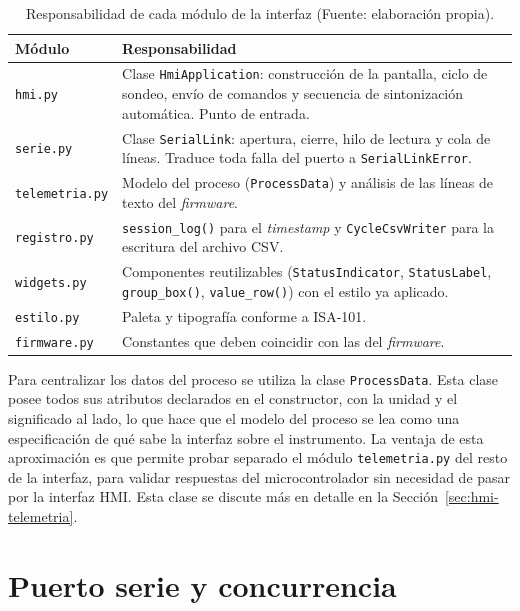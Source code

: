 \begin{table}[htbp]
\centering
  \begin{tabular}{@{}p{}p{}@{}}
  \toprule
  \textbf{Módulo} & \textbf{Responsabilidad} \\
  \midrule
  \texttt{hmi.py} & Clase \texttt{HmiApplication}: construcción de la pantalla, ciclo de sondeo, envío de comandos y secuencia de sintonización automática. Punto de entrada. \\
  \texttt{serie.py} & Clase \texttt{SerialLink}: apertura, cierre, hilo de lectura y cola de líneas. Traduce toda falla del puerto a \texttt{SerialLinkError}. \\
  \texttt{telemetria.py} & Modelo del proceso (\texttt{ProcessData}) y análisis de las líneas de texto del \emph{firmware}. \\
  \texttt{registro.py} & \texttt{session\_log()} para el \textit{timestamp} y \texttt{CycleCsvWriter} para la escritura del archivo CSV. \\
  \texttt{widgets.py} & Componentes reutilizables (\texttt{StatusIndicator}, \texttt{StatusLabel}, \texttt{group\_box()}, \texttt{value\_row()}) con el estilo ya aplicado. \\
  \texttt{estilo.py} & Paleta y tipografía conforme a ISA-101. \\
  \texttt{firmware.py} & Constantes que deben coincidir con las del \emph{firmware}. \\
  \bottomrule
  \end{tabular}
  \caption{Responsabilidad de cada módulo de la interfaz (Fuente: elaboración propia).}
  \label{tab:hmi-modulos}
\end{table}

Para centralizar los datos del proceso se utiliza la clase \texttt{ProcessData}. Esta clase posee todos sus atributos declarados en el constructor, con la unidad y el significado al lado, lo que hace que el modelo del proceso se lea como una especificación de qué sabe la interfaz sobre el instrumento. La ventaja de esta aproximación es que permite probar separado el módulo \texttt{telemetria.py} del resto de la interfaz, para validar respuestas del microcontrolador sin necesidad de pasar por la interfaz HMI. Esta clase se discute más en detalle en la Sección~\ref{sec:hmi-telemetria}.

\section{Puerto serie y concurrencia}
\label{sec:hmi-concurrencia}

